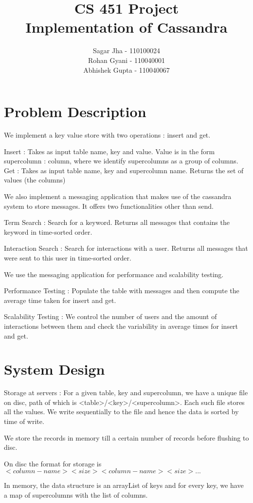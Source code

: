 \documentclass {article}
\title {CS 451 Project \\Implementation of Cassandra}
\author {Sagar Jha - 110100024\\ Rohan Gyani - 110040001 \\ Abhishek Gupta - 110040067}
\begin{document}
\maketitle

\section {Problem Description}
We implement a key value store with two operations : insert and get.

Insert : Takes as input table name, key and value. Value is in the form supercolumn : column, where we identify supercolumns as a group of columns.
Get : Takes as input table name, key and supercolumn name. Returns the set of values (the columns)

We also implement a messaging application that makes use of the cassandra system to store messages. It offers two functionalities other than send.

Term Search : Search for a keyword. Returns all messages that contains the keyword in time-sorted order.

Interaction Search : Search for interactions with a user. Returns all messages that were sent to this user in time-sorted order.

We use the messaging application for performance and scalability testing.

Performance Testing : Populate the table with messages and then compute the average time taken for insert and get.

Scalability Testing : We control the number of users and the amount of interactions between them and check the variability in average times for insert and get.

\section {System Design}
Storage at servers : For a given table, key and supercolumn, we have a unique file on disc, path of which is <table>/<key>/<supercolumn>. Each such file stores all the values. We write sequentially to the file and hence the data is sorted by time of write.

We store the records in memory till a certain number of records before flushing to disc.

On disc the format for storage is $<column-name> <size> <column-name> <size> ...$

In memory, the data structure is an arrayList of keys and for every key, we have a map of supercolumns with the list of columns.
\end{document}
